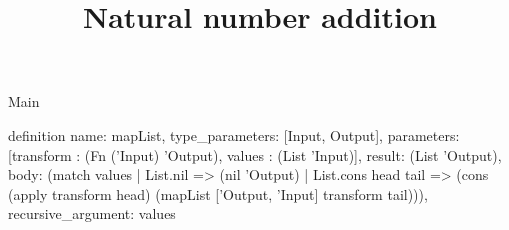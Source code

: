 \begin{lexlean}{Main}
\title{Natural number addition}
\begin{semanticmodule}
definition{
  name: mapList,
  type_parameters: [Input, Output],
  parameters: [transform : (Fn ('Input) 'Output), values : (List 'Input)],
  result: (List 'Output),
  body: (match values
    | List.nil => (nil 'Output)
    | List.cons head tail => (cons (apply transform head) (mapList ['Output, 'Input] transform tail))),
  recursive_argument: values
}
\end{semanticmodule}
\end{lexlean}
